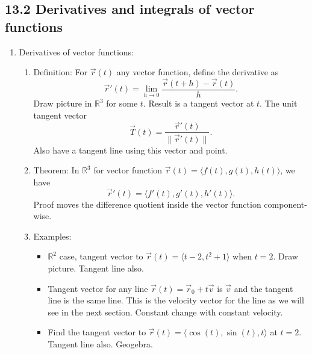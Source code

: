 \documentclass{article}
\begin{document}
\subsection{13.2 Derivatives and integrals of vector functions}

\begin{enumerate}

\item Derivatives of vector functions:
\begin{enumerate}
\item Definition: For $\vec{r}(t)$ any vector function, define the derivative as
\[
\vec{r}'(t) = \lim_{h \rightarrow 0} \frac{\vec{r}(t+h) - \vec{r}(t)}{h}.
\]
Draw picture in $\mathbb{R}^3$ for some $t$. Result is a tangent vector at $t$. The unit tangent vector 
\[
\vec{T}(t) = \frac{\vec{r}'(t)}{\|\vec{r}'(t) \|}.
\] 
Also have a tangent line using this vector and point. 

\item Theorem:  In $\mathbb{R}^3$ for vector function $\vec{r}(t) = \langle f(t), g(t), h(t) \rangle$, we have
\[
\vec{r}'(t) = \langle f'(t), g'(t), h'(t) \rangle.
\]
Proof moves the difference quotient inside the vector function component-wise.

\item Examples:
\begin{itemize}
\item $\mathbb{R}^2$ case, tangent vector to $\vec{r}(t) = \langle t-2, t^2+1 \rangle$ when $t=2$. Draw picture. Tangent line also.
\item Tangent vector for any line $\vec{r}(t)=\vec{r}_0 + t\vec{v}$ is $\vec{v}$ and the tangent line is the same line. This is the velocity vector for the line as we will see in the next section. Constant change with constant velocity.
\item Find the tangent vector to $\vec{r}(t) = \langle \cos(t), \sin(t), t \rangle$ at $t=2$. Tangent line also. Geogebra. 
\end{itemize}
\end{enumerate}


\end{enumerate}
\end{document}
